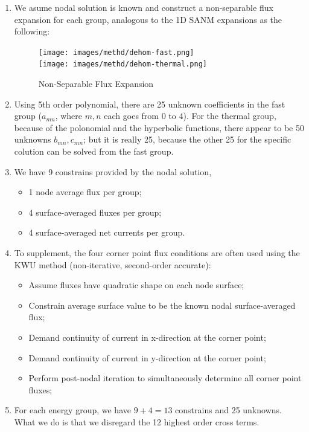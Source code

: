 \documentclass{school-22.211-notes}
\begin{document}
\clearpage
{}
\begin{enumerate}
\item We asume nodal solution is known and construct a non-separable flux expansion for each group, analogous to the 1D SANM expansions as the following:
\begin{figure}[ht]
  \centering
  \texttt{[image: images/methd/dehom-fast.png]} 
  \\
  \texttt{[image: images/methd/dehom-thermal.png]}   
  \caption{Non-Separable Flux Expansion} \label{dehom-energy-group}
\end{figure}

\item Using 5th order polynomial, there are 25 unknown coefficients in the fast group ($a_{mn}$, where $m,n$ each goes from $0$ to $4$). For the thermal group, because of the polonomial and the hyperbolic functions, there appear to be 50 unknowns $b_{mn}, c_{mn}$; but it is really 25, because the other 25 for the specific colution can be solved from the fast group.

\item We have 9 constrains provided by the nodal solution, 
  \begin{itemize}
    \item 1 node average flux per group; 
    \item 4 surface-averaged fluxes per group;
    \item 4 surface-averaged net currents per group. 
  \end{itemize}
  
\item To supplement, the four corner point flux conditions are often used using the KWU method (non-iterative, second-order accurate): 
  \begin{itemize}
    \item Assume fluxes have quadratic shape on each node surface;
    \item Constrain average surface value to be the known nodal surface-averaged flux;
    \item Demand continuity of current in x-direction at the corner point; 
    \item Demand continuity of current in y-direction at the corner point;
    \item Perform post-nodal iteration to simultaneously determine all corner point fluxes;
  \end{itemize}

\item For each energy group, we have $9 + 4 = 13$ constrains and 25 unknowns. What we do is that we disregard the 12 highest order cross terms. 
\end{enumerate}
\end{document}
